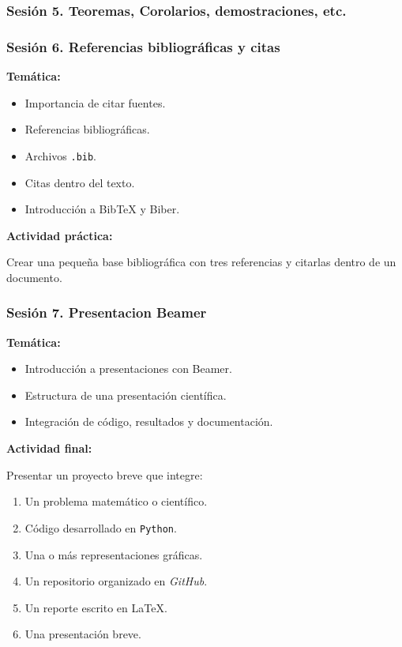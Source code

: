 \documentclass[12pt,letterpaper]{article}
\newcommand{\python}{\texttt{Python}}
\newcommand{\latexname}{\LaTeX}
\newcommand{\github}{\textit{GitHub}}
\begin{document}
\subsubsection*{Sesión 5. Teoremas, Corolarios, demostraciones, etc.}
\subsubsection*{Sesión 6. Referencias bibliográficas y citas}

\textbf{Temática:}
\begin{itemize}[noitemsep]
    \item Importancia de citar fuentes.
    \item Referencias bibliográficas.
    \item Archivos \texttt{.bib}.
    \item Citas dentro del texto.
    \item Introducción a BibTeX y Biber.
\end{itemize}

\textbf{Actividad práctica:}

Crear una pequeña base bibliográfica con tres referencias y citarlas
dentro de un documento.

\subsubsection*{Sesión 7. Presentacion Beamer}

\textbf{Temática:}
\begin{itemize}[noitemsep]
    \item Introducción a presentaciones con Beamer.
    \item Estructura de una presentación científica.
    \item Integración de código, resultados y documentación.
\end{itemize}

\textbf{Actividad final:}

Presentar un proyecto breve que integre:

\begin{enumerate}[noitemsep]
    \item Un problema matemático o científico.
    \item Código desarrollado en \python.
    \item Una o más representaciones gráficas.
    \item Un repositorio organizado en \github.
    \item Un reporte escrito en \latexname.
    \item Una presentación breve.
\end{enumerate}
\end{document}
